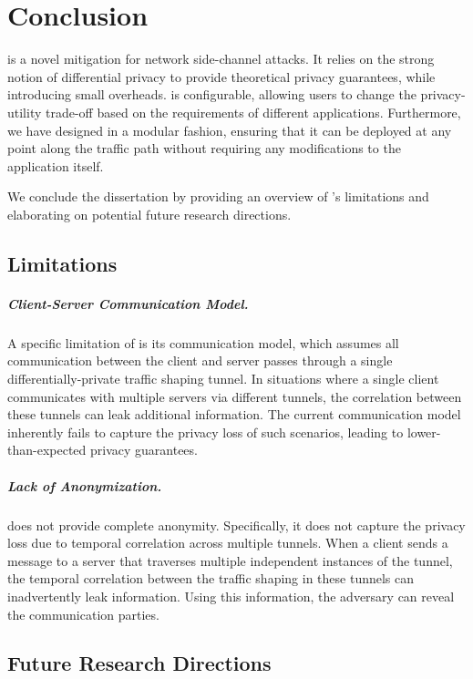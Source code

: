 \chapter{Conclusion}\label{ch:conclusion}
{\sys} is a novel mitigation for network side-channel attacks. 
It relies on the strong notion of differential privacy to provide theoretical privacy guarantees, while introducing small overheads. 
{\sys} is configurable, allowing users to change the privacy-utility trade-off based on the requirements of different applications. 
Furthermore, we have designed {\sys} in a modular fashion, ensuring that it can be deployed at any point along the traffic path without requiring any modifications to the application itself. 

We conclude the dissertation by providing an overview of {\sys}'s limitations and elaborating on potential future research directions.

\section{{\sys} Limitations}\label{sec:conclusion-limitations}
\paragraph{Client-Server Communication Model.}
A specific limitation of {\sys} is its communication model, which assumes all communication between the client and server passes through a single differentially-private traffic shaping tunnel.
In situations where a single client communicates with multiple servers via different tunnels, the correlation between these tunnels can leak additional information.
The current communication model inherently fails to capture the privacy loss of such scenarios, leading to lower-than-expected privacy guarantees.

\paragraph{Lack of Anonymization.}
{\sys} does not provide complete anonymity.
Specifically, it does not capture the privacy loss due to temporal correlation across multiple tunnels.
When a client sends a message to a server that traverses multiple independent instances of the {\sys} tunnel, the temporal correlation between the traffic shaping in these tunnels can inadvertently leak information. 
Using this information, the adversary can reveal the communication parties.

\section{Future Research Directions}\label{sec:conclusion-future}
